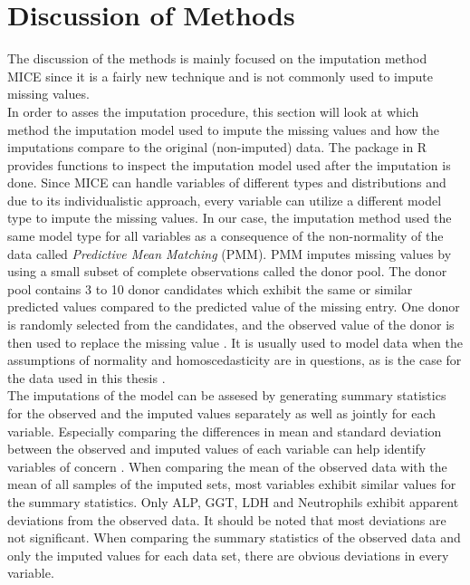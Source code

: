 \section{Discussion of Methods}
The discussion of the methods is mainly focused on the imputation method MICE 
since it is a fairly new technique and is not commonly used to impute missing 
values.
\\
In order to asses the imputation procedure, this section will look at which 
method the imputation model used to impute the missing values and how the 
imputations compare to the original (non-imputed) data. The  
package in R provides functions to inspect the imputation model used after the 
imputation is done. Since MICE can handle variables of different types and 
distributions and due to its individualistic approach, every variable can 
utilize a different model type to impute the missing values. In our case, the 
imputation method used the same model type for all variables as a consequence 
of the non-normality of the data called \textit{Predictive Mean Matching} (PMM).
PMM imputes missing values by using a small subset of complete observations 
called the donor pool. The donor pool contains 3 to 10 donor candidates which 
exhibit the same or similar predicted values compared to the predicted value of 
the missing entry. One donor is randomly selected from the candidates, and the
observed value of the donor is then used to replace the missing value 
\cite{RN144, RN145, RN146}. It is usually used to model data when the 
assumptions of normality and homoscedasticity are in questions, as is the case 
for the data used in this thesis \cite{RN146}.
\\
The imputations of the model can be assesed by generating summary statistics 
for the observed and the imputed values separately as well as jointly for each 
variable.
Especially comparing the differences in mean and standard deviation 
between the observed and imputed values of each variable can help identify 
variables of concern \cite{RN141}. When comparing the mean of the observed data 
with the mean of all samples of the imputed sets, most variables exhibit 
similar values for the summary statistics. Only ALP, GGT, LDH and Neutrophils 
exhibit apparent deviations from the observed data. It should be noted that 
most deviations are not significant.
When comparing the summary statistics of the observed data and only the imputed 
values for each data set, there are obvious deviations in every variable. 
